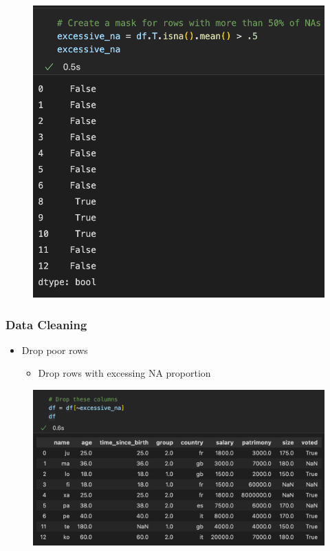 \begin{frame}
\begin{minipage}{0.58\linewidth}
      \begin{figure}[H]
         \includegraphics[scale=.35]{../images/illustrations/data_cleaning_detect_rows_excessive_na.png}
      \end{figure}
   \end{minipage}
\end{frame}

\begin{frame}\frametitle{Data Cleaning}
   \begin{itemize}
      \item Drop poor rows
      \begin{itemize}
         \item Drop rows with excessing NA proportion
      \end{itemize}
   \end{itemize}
   \vspace{.5cm}
   \begin{minipage}{0.38\linewidth}
      \begin{figure}[H]
         \includegraphics[scale=.35]{../images/illustrations/data_cleaning_drop_rows_excessive_na.png}
      \end{figure}
   \end{minipage}
\end{frame}


